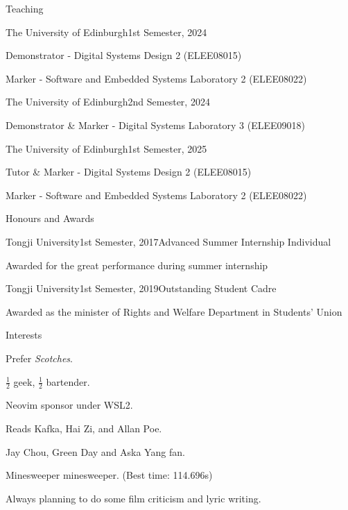 \documentclass{resume} %
\begin{document}
\begin{rSection}{Teaching}
	
	\begin{rSubsection}{The University of Edinburgh}{1st Semester, 2024}{}{}
		\item Demonstrator - Digital Systems Design 2 (ELEE08015)
		\item Marker - Software and Embedded Systems Laboratory 2 (ELEE08022)
	\end{rSubsection}
	
	\begin{rSubsection}{The University of Edinburgh}{2nd Semester, 2024}{}{}
		\item Demonstrator \& Marker - Digital Systems Laboratory 3 (ELEE09018)
	\end{rSubsection}
	
	\begin{rSubsection}{The University of Edinburgh}{1st Semester, 2025}{}{}
		\item Tutor \& Marker - Digital Systems Design 2 (ELEE08015)
		\item Marker - Software and Embedded Systems Laboratory 2 (ELEE08022)
	\end{rSubsection}
	
\end{rSection}

\begin{rSection}{Honours and Awards}
	
	\begin{rSubsection}{Tongji University}{1st Semester, 2017}{Advanced Summer Internship Individual}{}
		\item Awarded for the great performance during summer internship
	\end{rSubsection}
		
	\begin{rSubsection}{Tongji University}{1st Semester, 2019}{Outstanding Student Cadre}{}
		\item Awarded as the minister of Rights and Welfare Department in Students' Union
	\end{rSubsection}

\end{rSection}

\begin{rSection}{Interests}
	\item Prefer \textit{Scotches}.
	\item $\frac{1}{2}$ geek, $\frac{1}{2}$ bartender.
	\item Neovim sponsor under WSL2.
	\item Reads Kafka, Hai Zi, and Allan Poe.
	\item Jay Chou, Green Day and Aska Yang fan. 
	\item Minesweeper minesweeper. (Best time: 114.696s)
	\item Always planning to do some film criticism and lyric writing.
\end{rSection}
\end{document}
